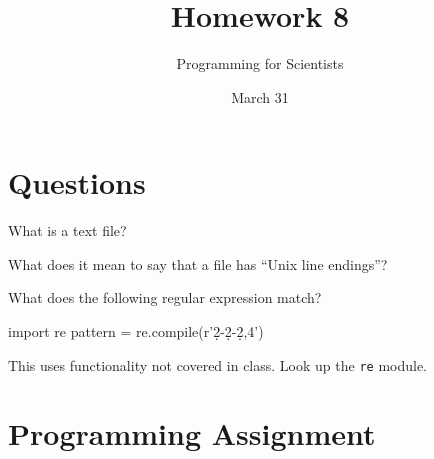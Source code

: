 
\author{Programming for Scientists}
\title{Homework 8}
\date{March 31}

\maketitle

\chapter{Questions}

\question
What is a text file?

\question
What does it mean to say that a file has ``Unix line endings''?

\question
What does the following regular expression match?

\begin{python}
import re
pattern = re.compile(r'\d{2}-\d{2}-\d{2,4}')
\end{python}

This uses functionality not covered in class. Look up the \texttt{re} module.

\question
\question
\question
\question

\chapter{Programming Assignment}




